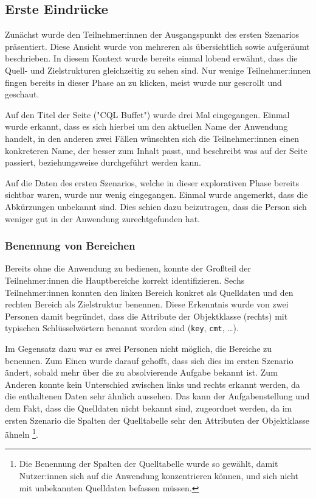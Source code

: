 \subsection{Erste Eindrücke}
\label{sec:impressions}

Zunächst wurde den Teilnehmer:innen der Ausgangspunkt des ersten Szenarios präsentiert. Diese Ansicht wurde von mehreren als übersichtlich sowie aufgeräumt beschrieben. In diesem Kontext wurde bereits einmal lobend erwähnt, dass die Quell- und Zielstrukturen gleichzeitig zu sehen sind. Nur wenige Teilnehmer:innen fingen bereits in dieser Phase an zu klicken, meist wurde nur gescrollt und geschaut.

Auf den Titel der Seite ("CQL Buffet") wurde drei Mal eingegangen. Einmal wurde erkannt, dass es sich hierbei um den aktuellen Name der Anwendung handelt, in den anderen zwei Fällen wünschten sich die Teilnehmer:innen einen konkreteren Name, der besser zum Inhalt passt, und beschreibt was auf der Seite passiert, beziehungsweise durchgeführt werden kann.

Auf die Daten des ersten Szenarios, welche in dieser explorativen Phase bereits sichtbar waren, wurde nur wenig eingegangen. Einmal wurde angemerkt, dass die Abkürzungen unbekannt sind. Dies schien dazu beizutragen, dass die Person sich weniger gut in der Anwendung zurechtgefunden hat.

\subsubsection{Benennung von Bereichen}

Bereits ohne die Anwendung zu bedienen, konnte der Großteil der Teilnehmer:innen die Hauptbereiche korrekt identifizieren. Sechs Teilnehmer:innen konnten den linken Bereich konkret als Quelldaten und den rechten Bereich als Zielstruktur benennen. Diese Erkenntnis wurde von zwei Personen damit begründet, dass die Attribute der Objektklasse (rechts) mit typischen Schlüsselwörtern benannt worden sind (\texttt{key}, \texttt{cmt}, \dots).

Im Gegensatz dazu war es zwei Personen nicht möglich, die Bereiche zu benennen. Zum Einen wurde darauf gehofft, dass sich dies im ersten Szenario ändert, sobald mehr über die zu absolvierende Aufgabe bekannt ist. Zum Anderen konnte kein Unterschied zwischen links und rechts erkannt werden, da die enthaltenen Daten sehr ähnlich aussehen. Das kann der Aufgabenstellung und dem Fakt, dass die Quelldaten nicht bekannt sind, zugeordnet werden, da im ersten Szenario die Spalten der Quelltabelle sehr den Attributen der Objektklasse ähneln \footnote{Die Benennung der Spalten der Quelltabelle wurde so gewählt, damit Nutzer:innen sich auf die Anwendung konzentrieren können, und sich nicht mit unbekannten Quelldaten befassen müssen.}.

